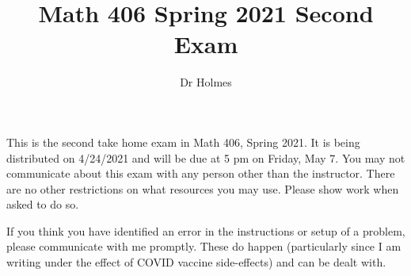\documentclass[12pt]{article}
\title{Math 406 Spring 2021 Second Exam}
\author{Dr Holmes}
\begin{document}
\maketitle

This is the second take home exam in Math 406, Spring 2021.  It is being distributed on 4/24/2021 and will be due at 5 pm on Friday, May 7.  You may not communicate about this exam with any person other than the instructor.  There are no other restrictions on what resources you may use.  Please show work when asked to do so.

If you think you have identified an error in the instructions or setup of a problem, please communicate with me promptly.  These do happen (particularly since I am writing under the effect of COVID vaccine side-effects) and can be dealt with.

\newpage
\end{document}
